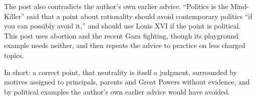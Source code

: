 \begin{afterword}
The post also contradicts the author's own earlier advice. ``Politics is the Mind-Killer'' said that a point about rationality should avoid contemporary politics ``if you can possibly avoid it,'' and should use Louis XVI if the point is political. This post uses abortion and the recent Gaza fighting, though its playground example needs neither, and then repeats the advice to practice on less charged topics.

In short: a correct point, that neutrality is itself a judgment, surrounded by motives assigned to principals, parents and Great Powers without evidence, and by political examples the author's own earlier advice would have avoided.
\end{afterword}
